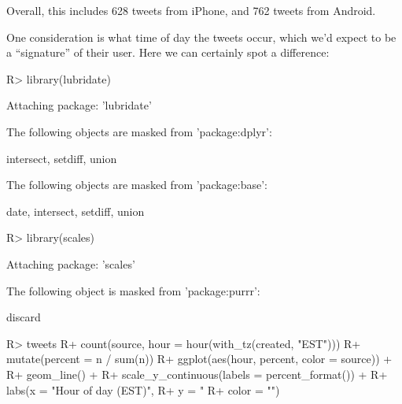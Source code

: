 \documentclass[
]{jss}
\begin{document}
Overall, this includes 628 tweets from iPhone, and 762 tweets from
Android.

One consideration is what time of day the tweets occur, which we'd
expect to be a ``signature'' of their user. Here we can certainly spot a
difference:

\begin{CodeChunk}

\begin{CodeInput}
R> library(lubridate)
\end{CodeInput}

\begin{CodeOutput}

Attaching package: 'lubridate'
\end{CodeOutput}

\begin{CodeOutput}
The following objects are masked from 'package:dplyr':

    intersect, setdiff, union
\end{CodeOutput}

\begin{CodeOutput}
The following objects are masked from 'package:base':

    date, intersect, setdiff, union
\end{CodeOutput}

\begin{CodeInput}
R> library(scales)
\end{CodeInput}

\begin{CodeOutput}

Attaching package: 'scales'
\end{CodeOutput}

\begin{CodeOutput}
The following object is masked from 'package:purrr':

    discard
\end{CodeOutput}

\begin{CodeInput}
R> tweets %
R+   count(source, hour = hour(with_tz(created, "EST"))) %
R+   mutate(percent = n / sum(n)) %
R+   ggplot(aes(hour, percent, color = source)) +
R+   geom_line() +
R+   scale_y_continuous(labels = percent_format()) +
R+   labs(x = "Hour of day (EST)",
R+        y = "%
R+        color = "")
\end{CodeInput}



\end{CodeChunk}
\end{document}
